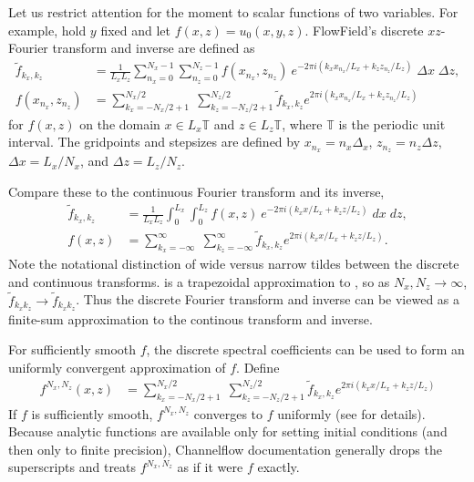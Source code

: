 \documentclass{article}[12pt]
\begin{document}
Let us restrict attention for the moment to scalar functions of two variables.
For example, hold $y$ fixed and let $f(x,z) = u_0(x,y,z)$. FlowField's
discrete $xz$-Fourier transform and inverse are defined as
\begin{align}
\widetilde{f}_{k_x, k_z} &= \frac{1}{L_x L_z} \sum_{n_x=0}^{N_x-1} \sum_{n_z=0}^{N_z-1} f(x_{n_x}, z_{n_z}) \: e^{-2 \pi i (k_x x_{n_x}/L_x + k_z z_{n_z}/L_z)} \; \Delta x \; \Delta z,
\label{eqn:2d_DFT} \\
f(x_{n_x},z_{n_z}) &= \sum_{k_x=-N_x/2+1}^{N_x/2} \; \sum_{k_z=-N_z/2+1}^{N_z/2} \widetilde{f}_{k_x, k_z} e^{2 \pi i (k_x x_{n_x}/L_x + k_z z_{n_z}/L_z)}
\label{eqn:2d_IDFT}
\end{align}
for $f(x,z)$ on the domain $x \in L_x \mathbb{T}$ and $z \in L_z \mathbb{T}$,
where $\mathbb{T}$ is the periodic unit interval. The gridpoints and stepsizes
are defined by $x_{n_x} = n_x \Delta_x$, $z_{n_z} = n_z \Delta z$, $\Delta x = L_x/N_x$, and $\Delta z = L_z/N_z$.

Compare these to the continuous Fourier transform and its inverse,
\begin{align}
\tilde{f}_{k_x, k_z} &= \frac{1}{L_x L_z} \int_0^{L_x}\int_0^{L_z} f(x,z) \: e^{-2 \pi i (k_x x/L_x + k_z z/L_z)} \; dx \; dz,
\label{eqn:2d_FT} \\
f(x,z) &= \sum_{k_x=-\infty}^{\infty} \; \sum_{k_z=-\infty}^{\infty} \tilde{f}_{k_x, k_z} e^{2 \pi i (k_x x/L_x + k_z z/L_z)}.
\label{eqn:2d_IFT}
\end{align}
Note the notational distinction of wide versus narrow tildes between the
discrete and continuous transforms.  is a trapezoidal
approximation to , so as $N_x, N_z \rightarrow \infty$,
$\widetilde{f}_{k_x k_z} \rightarrow \tilde{f}_{k_x k_z}$. Thus the
discrete Fourier transform and inverse can be viewed as a finite-sum
approximation to the continous transform and inverse.

For sufficiently smooth $f$, the discrete spectral coefficients can be
used to form an uniformly convergent approximation of $f$.  Define
\begin{align}
f^{N_x, N_z}(x,z) &= \sum_{k_x=-N_x/2+1}^{N_x/2} \; \sum_{k_z=-N_z/2+1}^{N_z/2} \widetilde{f}_{k_x, k_z} e^{2 \pi i (k_x x/L_x + k_z z/L_z)}
\label{eqn:2d_FA}
\end{align}
If $f$ is sufficiently smooth, $f^{N_x,N_z}$ converges to $f$ uniformly
(see \cite{Canuto88} for details). Because analytic functions are
available only for setting initial conditions (and then only to finite
precision), Channelflow documentation generally drops the superscripts
and treats $f^{N_x,N_z}$ as if it were $f$ exactly.
\end{document}
